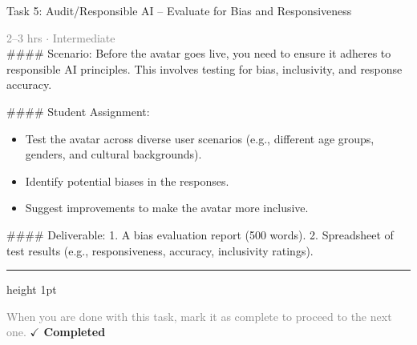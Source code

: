 \documentclass[10pt,a4paper]{article}
\begin{document}
\begin{taskbox}{Task 5: Audit/Responsible AI – Evaluate for Bias and Responsiveness}

    {\small \textcolor{gray}{2--3 hrs $\cdot$ Intermediate}}\\[12pt]

    \#\#\#\# Scenario:  
Before the avatar goes live, you need to ensure it adheres to responsible AI principles. This involves testing for bias, inclusivity, and response accuracy.  

\#\#\#\# Student Assignment:  
\begin{itemize}
    \item Test the avatar across diverse user scenarios (e.g., different age groups, genders, and cultural backgrounds).  
    \item Identify potential biases in the responses.  
    \item Suggest improvements to make the avatar more inclusive.  
\end{itemize}

\#\#\#\# Deliverable:  
1. A bias evaluation report (500 words).  
2. Spreadsheet of test results (e.g., responsiveness, accuracy, inclusivity ratings).\par

    \vspace{16pt}

    \textcolor{cardBorder}{\hrule height 1pt}\vspace{8pt}

    \small \textcolor{gray}{When you are done with this task, mark it as complete to proceed to the next one.} \hfill \textbf{\textcolor{brandDark}{$\checkmark$ Completed}}

\end{taskbox}
\end{document}
